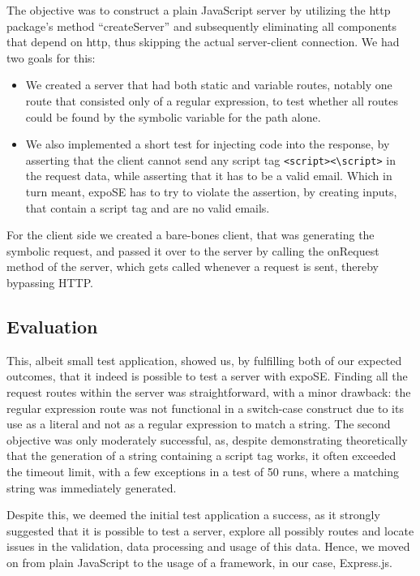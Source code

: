 The objective was to construct a plain JavaScript server by utilizing the http package's method “createServer” and subsequently eliminating all components that depend on http, thus skipping the actual server-client connection.
We had two goals for this: 
\begin{itemize}
    \item  We created a server that had both static and variable routes, notably one route that consisted only of a regular expression, to test whether all routes could be found by the symbolic variable for the path alone.
    \item  We also implemented a short test for injecting code into the response, by asserting that the client cannot send any script tag \lstinline{<script><\script>} in the request data, while asserting that it has to be a valid email. Which in turn meant, expoSE has to try to violate the assertion, by creating inputs, that contain a script tag and are no valid emails. 
\end{itemize}
For the client side we created a bare-bones client, that was generating the symbolic request, and passed it over to the server by calling the onRequest method of the server, which gets called whenever a request is sent, thereby bypassing HTTP. 

\subsection{Evaluation}
This, albeit small test application, showed us, by fulfilling both of our expected outcomes, that it indeed is possible to test a server with expoSE. Finding all the request routes within the server was straightforward, with a minor drawback: the regular expression route was not functional in a switch-case construct due to its use as a literal and not as a regular expression to match a string. 
The second objective was only moderately successful, as, despite demonstrating theoretically that the generation of a string containing a script tag works, it often exceeded the timeout limit, with a few exceptions in a test of 50 runs, where a matching string was immediately generated.

Despite this, we deemed the initial test application a success, as it strongly suggested that it is possible to test a server, explore all possibly routes and locate issues in the validation, data processing and usage of this data. Hence, we moved on from plain JavaScript to the usage of a framework, in our case, Express.js.
